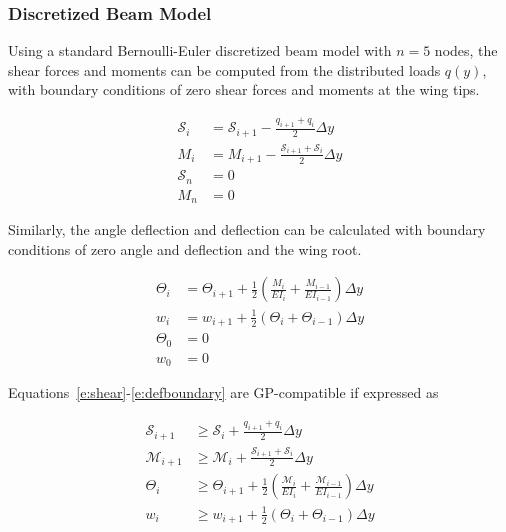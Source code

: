 \documentclass[]{aiaa-tc}%
\begin{document}
\subsubsection{Discretized Beam Model}

Using a standard Bernoulli-Euler discretized beam model with $n=5$ nodes, the shear forces and moments can be computed from the distributed loads $q(y)$, with boundary conditions of zero shear forces and moments at the wing tips.\cite{bending}

\begin{align}
    \label{e:shear}
    \mathcal{S}_i &= \mathcal{S}_{i+1} - \frac{q_{i+1} + q_i}{2}\Delta y \\
    \label{e:moment}
    M_i &= M_{i+1} - \frac{\mathcal{S}_{i+1} + \mathcal{S}_i}{2}\Delta y \\
    \label{e:shearboundary}
    \mathcal{S}_n &= 0 \\
    \label{e:momentboundary}
    M_n &= 0
\end{align}

Similarly, the angle deflection and deflection can be calculated with boundary conditions of zero angle and deflection and the wing root.\cite{bending}

\begin{align}
    \label{e:angle}
    \Theta_{i} &= \Theta_{i+1} + \frac{1}{2} \left(\frac{M_i}{EI_i} + \frac{M_{i-1}}{EI_{i-1}} \right) \Delta y \\
    \label{e:deflection}
    w_{i} &= w_{i+1} + \frac{1}{2} (\Theta_i + \Theta_{i-1}) \Delta y \\
    \label{e:angleboundary}
    \Theta_0 &= 0 \\
    \label{e:defboundary}
    w_0 &= 0 
\end{align}
 
Equations~\eqref{e:shear}-\eqref{e:defboundary} are GP-compatible if expressed as

\begin{align}
    \label{e:sheargp}
    \mathcal{S}_{i+1} &\geq \mathcal{S}_i + \frac{q_{i+1} + q_i}{2} \Delta y \\
    \label{e:momentgp}
    \mathcal{M}_{i+1} &\geq \mathcal{M}_i + \frac{\mathcal{S}_{i+1} + \mathcal{S}_i}{2} \Delta y \\
    \label{e:anglegp}
    \Theta_{i} &\geq \Theta_{i+1} + \frac{1}{2} \left(\frac{\mathcal{M}_i}{EI_i} + \frac{\mathcal{M}_{i-1}}{EI_{i-1}} \right) \Delta y \\
    \label{e:deflection}
    w_{i} &\geq w_{i+1} + \frac{1}{2} (\Theta_i + \Theta_{i-1}) \Delta y 
\end{align}
\end{document}
